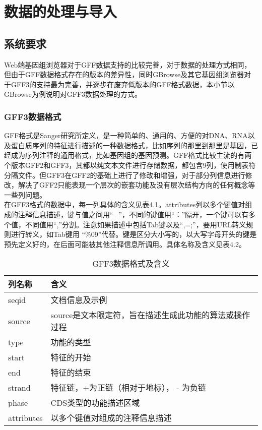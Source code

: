 \chapter{数据的处理与导入}
	\section{系统要求}
	Web端基因组浏览器对于GFF数据支持的比较完善，对于数据的处理方式相同，但由于GFF数据格式存在的版本的差异性，同时GBrowse及其它基因组浏览器对于GFF3的支持最为完善，并逐步在废弃低版本的GFF格式数据，本小节以GBrowse为例说明对GFF3数据处理的方式。
	\subsection{GFF3数据格式}
	GFF格式是Sanger研究所定义，是一种简单的、通用的、方便的对DNA、RNA以及蛋白质序列的特征进行描述的一种数据格式，比如序列的那里到那里是基因，已经成为序列注释的通用格式，比如基因组的基因预测。GFF格式比较主流的有两个版本GFF2和GFF3，其都以纯文本文件进行存储数据，都包含9列，使用制表符分隔文件。但GFF3在GFF2的基础上进行了修改和增强，对于部分列信息进行修改，解决了GFF2只能表现一个层次的嵌套功能及没有层次结构方向的任何概念等一些列问题。\\
	\indent 在GFF3格式的数据中，每一列具体的含义见表4.1。attributes列以多个键值对组成的注释信息描述，键与值之间用“=”，不同的键值用“：”隔开，一个键可以有多个值，不同值用“,”分割。注意如果描述中包括Tab键以及“,=;”，要用URL转义规则进行转义，如Tab键用 “\%09”代替。键是区分大小写的，以大写字母开头的键是预先定义好的，在后面可能被其他注释信息所调用。具体名称及含义见表4.2。
	\begin{table}[!htbp]
		\centering
		\begin{tabular}{ll}	
			\toprule
			列名称& 含义\\
			\midrule
			seqid&文档信息及示例\\
			source&source是文本限定符，旨在描述生成此功能的算法或操作过程\\
			type&功能的类型\\
			start&特征的开始 \\
			end&特征的结束\\
			strand&特征链，+为正链（相对于地标）， - 为负链\\
			phase&CDS类型的功能描述区域\\
			attributes&以多个键值对组成的注释信息描述\\
			\bottomrule
		\end{tabular}
		\caption{GFF3数据格式及含义}
	\end{table}
	
